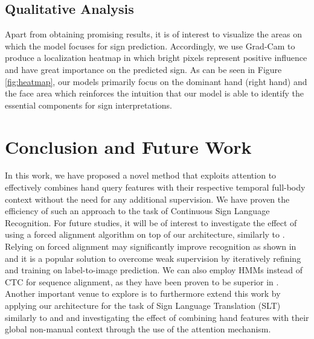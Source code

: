 \documentclass[a4paper,conference]{IEEEtran}
\begin{document}
\subsection{Qualitative Analysis}

Apart from obtaining promising results, it is of interest to visualize the areas on which the model focuses for sign prediction. Accordingly, we use Grad-Cam \cite{selvaraju2017grad} to produce a localization heatmap in which bright pixels represent positive influence and have great importance on the predicted sign. As can be seen in Figure \ref{fig:heatmap}, our models primarily focus on the dominant hand (right hand) and the face area which reinforces the intuition that our model is able to identify the essential components for sign interpretations. 

















\section{Conclusion and Future Work}

In this work,  we have proposed a novel method that exploits attention to effectively combines hand query features with their respective temporal full-body context without the need for any additional supervision. We have proven the efficiency of such an approach to the task of Continuous Sign Language Recognition. For future studies, it will be of interest to investigate the effect of using a forced alignment algorithm on top of our architecture, similarly to \cite{koller2017re, pami2019}. Relying on forced alignment may significantly improve recognition as shown in \cite{koller2017re} and it is a popular solution to overcome weak supervision by iteratively refining and training on label-to-image prediction. We can also employ HMMs instead of CTC for sequence alignment, as they have been proven to be superior in \cite{camgoz2017subunets}. Another important venue to explore is to furthermore extend this work by applying our architecture for the task of Sign Language Translation (SLT) similarly to \cite{cihan2018neural} and \cite{camgoz2020} and investigating the effect of combining hand features with their global non-manual context through the use of the attention mechanism.
\end{document}
